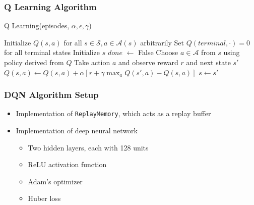 \documentclass{beamer}
\begin{document}
\begin{frame}
    \frametitle{Q Learning Algorithm}

    \begin{algorithm}[H]
        \caption{Q Learning(episodes, \(\alpha, \epsilon, \gamma\))}
        \label{alg:qlearning}
        \begin{algorithmic}[1]
            \State Initialize \(Q(s,a)\) for all \(s \in \mathcal{S}, a \in \mathcal{A}(s)\) arbitrarily
            \State Set \(Q(terminal, \cdot) = 0 \) for all terminal states
            \State Initialize \(s\)
            \State \(done\) \(\leftarrow\) False
            \State Choose \(a \in \mathcal{A}\) from \(s\) using policy derived from \(Q\)
            \State Take action \(a\) and observe reward \(r\) and next state \(s'\)
            \State \(Q(s, a) \leftarrow Q(s, a) + \alpha \left[r + \gamma \max_{a} Q(s', a) - Q(s, a)\right]\)
            \State \(s \leftarrow s'\)
            \EndWhile
            \EndFor
        \end{algorithmic}
    \end{algorithm}

\end{frame}

\begin{frame}
    \frametitle{DQN Algorithm Setup}

    \begin{itemize}
        \item Implementation of \texttt{ReplayMemory}, which acts as a replay buffer \pause
        \item Implementation of deep neural network \pause
              \begin{itemize}
                  \item Two hidden layers, each with 128 units
                  \item ReLU activation function
                  \item Adam's optimizer
                  \item Huber loss
              \end{itemize}
    \end{itemize}

\end{frame}
\end{document}
